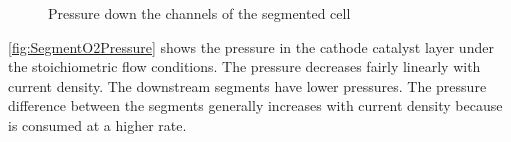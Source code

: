 \begin{figure}[htbp]
  \quad
  \caption{Pressure down the channels of the segmented cell}%
  \label{fig:SegmentPolarization}
\end{figure}

\autoref{fig:SegmentO2Pressure} shows the  pressure in the cathode catalyst layer under the stoichiometric flow conditions.  The pressure decreases fairly linearly with current density.  The downstream segments have lower pressures.  The pressure difference between the segments generally increases with current density because  is consumed at a higher rate.

